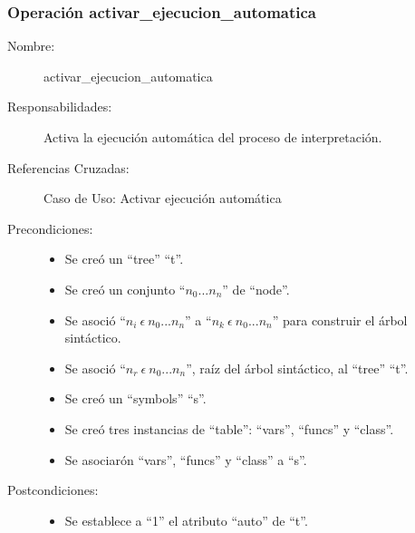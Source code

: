 \subsubsection{Operación activar\_ejecucion\_automatica}
\FloatBarrier
\begin{framed}
	\begin{description}
		\item [Nombre:] activar\_ejecucion\_automatica
		\item [Responsabilidades:] Activa la ejecución automática del proceso de interpretación.
		\item [Referencias Cruzadas: ] Caso de Uso: Activar ejecución automática
      \item [Precondiciones:] \hfill
         \begin {itemize}
         \item Se creó un ``tree'' ``t''.
         \item Se creó un conjunto ``$n_0...n_n$'' de ``node''.
         \item Se asoció ``$n_i\ \epsilon\ n_0...n_n$'' a ``$n_k\ \epsilon\ n_0...n_n$'' para construir el árbol sintáctico.
         \item Se asoció  ``$n_r\ \epsilon\ n_0...n_n$'', raíz del árbol sintáctico, al ``tree'' ``t''.
         \item Se creó un ``symbols'' ``s''.
         \item Se creó tres instancias de ``table'': ``vars'', ``funcs'' y ``class''.
         \item Se asociarón ``vars'', ``funcs'' y ``class'' a ``s''.
      \end{itemize}
      \item [Postcondiciones:] \hfill
      \begin {itemize}
         \item Se establece a ``1'' el atributo ``auto'' de ``t''.
      \end{itemize}
	\end{description} 
\end{framed}
\FloatBarrier

